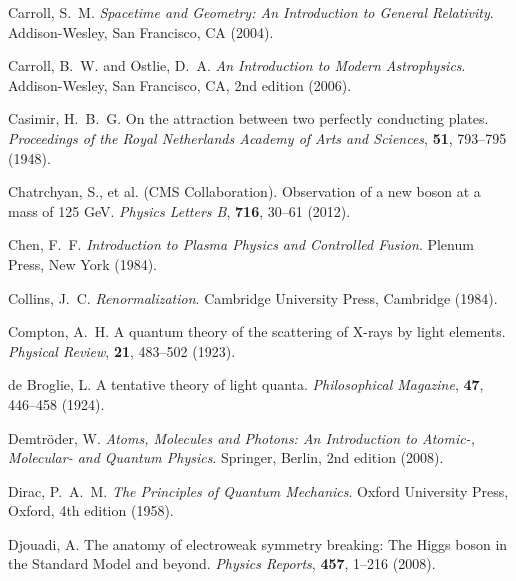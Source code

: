 \documentclass[12pt,a4paper]{article}
\begin{document}
\begin{thebibliography}{99}
		Carroll, S.~M.
		\newblock \textit{Spacetime and Geometry: An Introduction to General Relativity}.
		\newblock Addison-Wesley, San Francisco, CA (2004).
		
		Carroll, B.~W. and Ostlie, D.~A.
		\newblock \textit{An Introduction to Modern Astrophysics}.
		\newblock Addison-Wesley, San Francisco, CA, 2nd edition (2006).
		
		Casimir, H.~B.~G.
		\newblock On the attraction between two perfectly conducting plates.
		\newblock \textit{Proceedings of the Royal Netherlands Academy of Arts and Sciences}, \textbf{51}, 793--795 (1948).
		
		Chatrchyan, S., et al. (CMS Collaboration).
		\newblock Observation of a new boson at a mass of 125 GeV.
		\newblock \textit{Physics Letters B}, \textbf{716}, 30--61 (2012).
		\newblock {}
		
		Chen, F.~F.
		\newblock \textit{Introduction to Plasma Physics and Controlled Fusion}.
		\newblock Plenum Press, New York (1984).
		
		Collins, J.~C.
		\newblock \textit{Renormalization}.
		\newblock Cambridge University Press, Cambridge (1984).
		
		Compton, A.~H.
		\newblock A quantum theory of the scattering of X-rays by light elements.
		\newblock \textit{Physical Review}, \textbf{21}, 483--502 (1923).
		\newblock {}
		
		de Broglie, L.
		\newblock A tentative theory of light quanta.
		\newblock \textit{Philosophical Magazine}, \textbf{47}, 446--458 (1924).
		\newblock {}
		
		Demtröder, W.
		\newblock \textit{Atoms, Molecules and Photons: An Introduction to Atomic-, Molecular- and Quantum Physics}.
		\newblock Springer, Berlin, 2nd edition (2008).
		
		Dirac, P.~A.~M.
		\newblock \textit{The Principles of Quantum Mechanics}.
		\newblock Oxford University Press, Oxford, 4th edition (1958).
		
		Djouadi, A.
		\newblock The anatomy of electroweak symmetry breaking: The Higgs boson in the Standard Model and beyond.
		\newblock \textit{Physics Reports}, \textbf{457}, 1--216 (2008).
		\newblock {}
		

\end{thebibliography}
\end{document}
